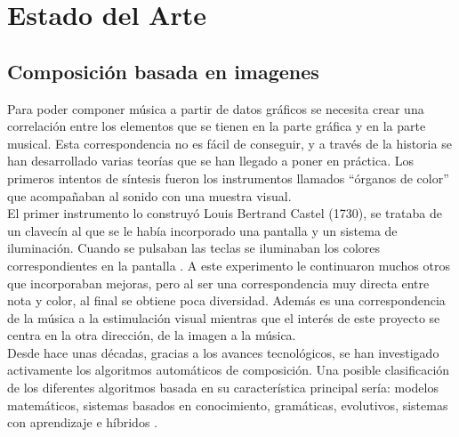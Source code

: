 \section{Estado del Arte}
\label{sec:estadodelarte}



\subsection{Composición basada en imagenes}


Para poder componer música a partir de datos gráficos se necesita crear una correlación entre los elementos que se tienen en la parte gráfica y en la parte musical. Esta correspondencia no es fácil de conseguir, y a través de la historia se han desarrollado varias teorías que se han llegado a poner en práctica. Los primeros intentos de síntesis fueron los instrumentos llamados ``órganos de color'' que acompañaban al sonido con una muestra visual.\\

El primer instrumento lo construyó Louis Bertrand Castel (1730), se trataba de un clavecín al que se le había incorporado una pantalla y un sistema de iluminación. Cuando se pulsaban las teclas se iluminaban los colores correspondientes en la pantalla \cite{organosColor}. A este experimento le continuaron muchos otros que incorporaban mejoras, pero al ser una correspondencia muy directa entre nota y color, al final se obtiene poca diversidad. Además es una correspondencia de la música a la estimulación visual mientras que el interés de este proyecto se centra en la otra dirección, de la imagen a la música.\\

Desde hace unas décadas, gracias a los avances tecnológicos, se han investigado activamente los algoritmos automáticos de composición. Una posible clasificación de los diferentes algoritmos basada en su característica principal sería: modelos matemáticos, sistemas basados en conocimiento, gramáticas, evolutivos, sistemas con aprendizaje e híbridos \cite{AIMethodsForComposition}.


